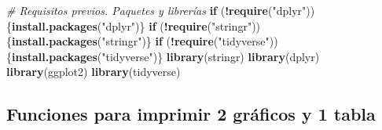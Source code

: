 \documentclass[
]{article}
\newenvironment{Shaded}{\begin{snugshade}}{\end{snugshade}}
\newcommand{\CommentTok}[1]{\textcolor[rgb]{0.56,0.35,0.01}{\textit{#1}}}
\newcommand{\ControlFlowTok}[1]{\textcolor[rgb]{0.13,0.29,0.53}{\textbf{#1}}}
\newcommand{\FunctionTok}[1]{\textcolor[rgb]{0.13,0.29,0.53}{\textbf{#1}}}
\newcommand{\NormalTok}[1]{#1}
\newcommand{\SpecialCharTok}[1]{\textcolor[rgb]{0.81,0.36,0.00}{\textbf{#1}}}
\newcommand{\StringTok}[1]{\textcolor[rgb]{0.31,0.60,0.02}{#1}}
\begin{document}
\begin{Shaded}
\begin{Highlighting}[]
\CommentTok{\# Requisitos previos. Paquetes y librerías}
\ControlFlowTok{if}\NormalTok{ (}\SpecialCharTok{!}\FunctionTok{require}\NormalTok{(}\StringTok{"dplyr"}\NormalTok{)) \{}\FunctionTok{install.packages}\NormalTok{(}\StringTok{"dplyr"}\NormalTok{)\}}
\ControlFlowTok{if}\NormalTok{ (}\SpecialCharTok{!}\FunctionTok{require}\NormalTok{(}\StringTok{"stringr"}\NormalTok{)) \{}\FunctionTok{install.packages}\NormalTok{(}\StringTok{"stringr"}\NormalTok{)\}}
\ControlFlowTok{if}\NormalTok{ (}\SpecialCharTok{!}\FunctionTok{require}\NormalTok{(}\StringTok{"tidyverse"}\NormalTok{))\{}\FunctionTok{install.packages}\NormalTok{(}\StringTok{"tidyverse"}\NormalTok{)\}}
\FunctionTok{library}\NormalTok{(stringr)}
\FunctionTok{library}\NormalTok{(dplyr)}
\FunctionTok{library}\NormalTok{(ggplot2)}
\FunctionTok{library}\NormalTok{(tidyverse)}
\end{Highlighting}
\end{Shaded}

\hypertarget{funciones-para-imprimir-2-gruxe1ficos-y-1-tabla}{%
\subsection{Funciones para imprimir 2 gráficos y 1
tabla}\label{funciones-para-imprimir-2-gruxe1ficos-y-1-tabla}}
\end{document}
